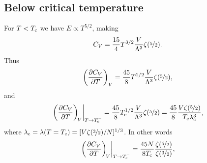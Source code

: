 \documentclass[11pt,letter, swedish, english
]{article}
\begin{document}
\subsection{Below critical temperature}
For $T<T_{\text{c}}$ we have $E\propto T^{5/2}$, making
\begin{equation}
C_V=\frac{15}{4}T^{3/2}\frac{V}{\Lambda^3}\zeta(\nicefrac{5}{2}).
\end{equation}
Thus
\begin{equation}
\qty(\pdv{C_V}{T})_V
=\frac{45}{8}T^{1/2}\frac{V}{\Lambda^3}\zeta(\nicefrac{5}{2}),
\end{equation}
and
\begin{equation}
\eval{\qty(\pdv{C_V}{T})_{\!V}}_{T\to\Tc^-}
=\frac{45}{8}\Tc^{1/2}\frac{V}{\Lambda^3}\zeta(\nicefrac{5}{2})
=\frac{45}{8}\frac{V\zeta(\nicefrac{5}{2})}{\Tc\lambda_\text{c}^3},
\end{equation}
where
$\lambda_\text{c}=\lambda(T=T_{\text{c}})=[V\zeta(\nicefrac{3}{2})/N]^{1/3}$. In
other words
\begin{equation}\label{eq:1_Tc-}
\eval{\qty(\pdv{C_V}{T})_{\!V}}_{T\to\Tc^-}
=\frac{45N}{8\Tc}\frac{\zeta(\nicefrac{5}{2})}{\zeta(\nicefrac{3}{2})},
\end{equation}
\end{document}
